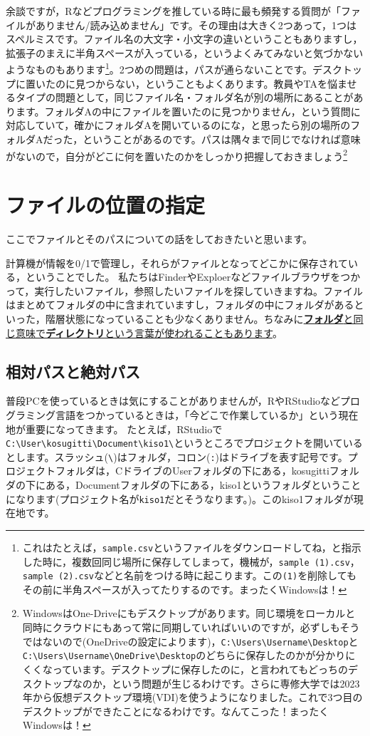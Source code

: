 \documentclass{ltjsbook}
\begin{document}
余談ですが，Rなどプログラミングを推している時に最も頻発する質問が「ファイルがありません/読み込めません」です。その理由は大きく2つあって，1つはスペルミスです。ファイル名の大文字・小文字の違いということもありますし，拡張子のまえに半角スペースが入っている，というよくみてみないと気づかないようなものもあります\footnote{これはたとえば，\verb|sample.csv|というファイルをダウンロードしてね，と指示した時に，複数回同じ場所に保存してしまって，機械が，\verb|sample (1).csv|，\verb|sample (2).csv|などと名前をつける時に起こります。この\verb|(1)|を削除してもその前に半角スペースが入ってたりするのです。まったくWindowsは！}。2つめの問題は，パスが通らないことです。デスクトップに置いたのに見つからない，ということもよくあります。教員やTAを悩ませるタイプの問題として，同じファイル名・フォルダ名が別の場所にあることがあります。フォルダAの中にファイルを置いたのに見つかりません，という質問に対応していて，確かにフォルダAを開いているのにな，と思ったら別の場所のフォルダAだった，ということがあるのです。パスは隅々まで同じでなければ意味がないので，自分がどこに何を置いたのかをしっかり把握しておきましょう\footnote{WindowsはOne-Driveにもデスクトップがあります。同じ環境をローカルと同時にクラウドにもあって常に同期していればいいのですが，必ずしもそうではないので(OneDriveの設定によります)，\verb|C:\Users\Username\Desktop|と\verb|C:\Users\Username\OneDrive\Desktop|のどちらに保存したのかが分かりにくくなっています。デスクトップに保存したのに，と言われてもどっちのデスクトップなのか，という問題が生じるわけです。さらに専修大学では2023年から仮想デスクトップ環境(VDI)を使うようになりました。これで3つ目のデスクトップができたことになるわけです。なんてこった！まったくWindowsは！}

\section{ファイルの位置の指定}
\label{setLocation}
ここでファイルとそのパスについての話をしておきたいと思います。

計算機が情報を0/1で管理し，それらがファイルとなってどこかに保存されている，ということでした。
私たちはFinderやExploerなどファイルブラウザをつかって，実行したいファイル，参照したいファイルを探していきますね。ファイルはまとめてフォルダの中に含まれていますし，フォルダの中にフォルダがあるといった，階層状態になっていることも少なくありません。ちなみに\underline{\textbf{フォルダ}と同じ意味で\textbf{ディレクトリ}という言葉が使われることもあります}。

\subsection{相対パスと絶対パス}
普段PCを使っているときは気にすることがありませんが，RやRStudioなどプログラミング言語をつかっているときは，「今どこで作業しているか」という現在地が重要になってきます。
たとえば，RStudioで\verb|C:\User\kosugitti\Document\kiso1\|というところでプロジェクトを開いているとします。スラッシュ(\verb|\|)はフォルダ，コロン(\verb|:|)はドライブを表す記号です。プロジェクトフォルダは，CドライブのUserフォルダの下にある，kosugittiフォルダの下にある，Documentフォルダの下にある，kiso1というフォルダということになります(プロジェクト名が\texttt{kiso1}だとそうなります。)。このkiso1フォルダが現在地です。
\end{document}
